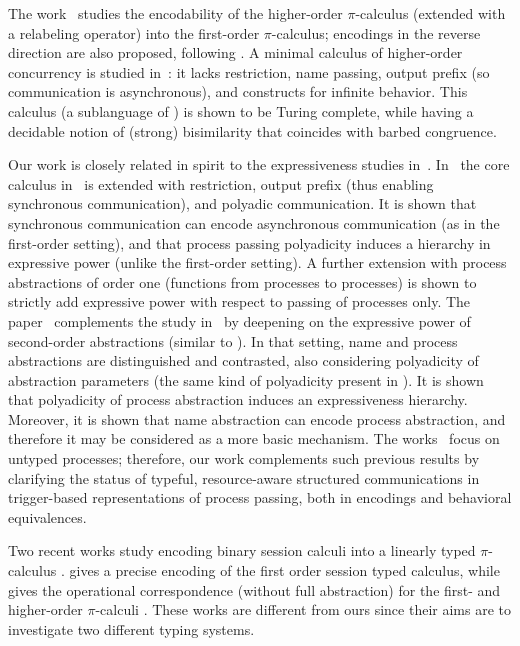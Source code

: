 The work~\cite{XuActa2012} studies the encodability of the higher-order $\pi$-calculus (extended with a relabeling operator) into the first-order $\pi$-calculus; encodings in the reverse direction are also proposed, following \cite{Tho90}.
A minimal calculus of higher-order concurrency is studied in~\cite{DBLP:journals/iandc/LanesePSS11}: it lacks restriction,  name passing, output prefix (so  communication is asynchronous), and constructs for infinite behavior. 
This calculus (a sublanguage of \HO) is shown to be Turing complete, while having a decidable notion of  
(strong) bisimilarity that coincides with barbed congruence. 

Our work is closely related in spirit to the expressiveness studies in~\cite{DBLP:conf/icalp/LanesePSS10,DBLP:conf/wsfm/XuYL13}.
In~\cite{DBLP:conf/icalp/LanesePSS10}
the core calculus in~\cite{DBLP:journals/iandc/LanesePSS11} is extended with restriction, output prefix (thus enabling synchronous communication), 
and polyadic communication. It is shown that 
synchronous communication can encode asynchronous communication (as in the first-order setting),
and that process passing polyadicity induces a hierarchy in expressive power (unlike the first-order setting).
A further extension with process abstractions of order one
(functions from processes to processes)
 is shown to strictly add expressive power with respect to passing of processes only.
The paper~\cite{DBLP:conf/wsfm/XuYL13} complements the study in~\cite{DBLP:conf/icalp/LanesePSS10} by deepening on the expressive power of second-order abstractions (similar to \HO). 
In that setting, name and process abstractions are distinguished and contrasted, also considering polyadicity of abstraction parameters (the same kind of polyadicity present in \pHOp). It is shown that polyadicity of process abstraction induces an expressiveness hierarchy. Moreover, it is shown that name abstraction can encode process abstraction, and therefore it may be considered as a more basic mechanism. 
The works~\cite{DBLP:conf/icalp/LanesePSS10,DBLP:conf/wsfm/XuYL13} focus on untyped processes;
therefore, our work complements such previous results by clarifying the status of typeful, resource-aware structured communications in
trigger-based representations of process passing, both in encodings and  behavioral equivalences.

Two recent works \cite{DemangeonH11,Dardha:2012:STR:2370776.2370794} 
study encoding binary session calculi into 
a linearly typed $\pi$-calculus \cite{BHY}.
\cite{DemangeonH11}
gives a precise encoding of the first order 
session typed calculus, while 
\cite{Dardha:2012:STR:2370776.2370794} 
gives the operational correspondence (without full abstraction)
for the first- and higher-order 
$\pi$-calculi \cite{tlca07}. 
These works are different from ours since their aims 
are to investigate two different typing systems.  

